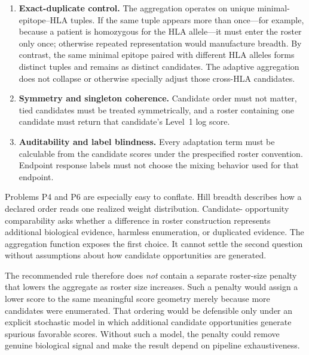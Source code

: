 \documentclass[11pt]{article}
\begin{document}
\begin{enumerate}[label=\textbf{P\arabic*.},leftmargin=*]
  \item \textbf{Exact-duplicate control.}
  The aggregation operates on unique minimal-epitope--HLA tuples. If the same
  tuple appears more than once---for example, because a patient is homozygous
  for the HLA allele---it must enter the roster only once; otherwise repeated
  representation would manufacture breadth. By contrast, the same minimal
  epitope paired with different HLA alleles forms distinct tuples and remains
  as distinct candidates. The adaptive aggregation does not collapse or
  otherwise specially adjust those cross-HLA candidates.

  \item \textbf{Symmetry and singleton coherence.}
  Candidate order must not matter, tied candidates must be treated
  symmetrically, and a roster containing one candidate must return that
  candidate's Level~1 log score.

  \item \textbf{Auditability and label blindness.}
  Every adaptation term must be calculable from the candidate scores under the
  prespecified roster convention. Endpoint response labels must not choose the
  mixing behavior used for that endpoint.
\end{enumerate}

Problems P4 and P6 are especially easy to conflate. Hill breadth describes
how a declared order reads one realized weight distribution. Candidate-
opportunity comparability asks whether a difference in roster construction
represents additional biological evidence, harmless enumeration, or
duplicated evidence. The aggregation function exposes the first choice. It
cannot settle the second question without assumptions about how candidate
opportunities are generated.

The recommended rule therefore does \emph{not} contain a separate roster-size
penalty that lowers the aggregate as roster size increases. Such a penalty
would assign a lower score to the same meaningful score geometry merely
because more candidates were enumerated.
That ordering would be defensible only under an explicit stochastic model in
which additional candidate opportunities generate spurious favorable scores.
Without such a model, the penalty could remove genuine biological signal and
make the result depend on pipeline exhaustiveness.
\end{document}
